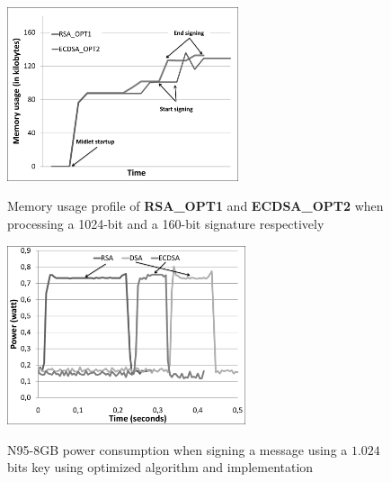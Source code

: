 \documentclass[authoryear]{elsarticle}
\begin{document}
\begin{figure}[h]
\begin{center}
  \includegraphics[width=6.8cm]{immagini/MemoryRSA1ECDSA2.pdf}\\
  \caption{Memory usage profile of \textbf{RSA\_OPT1} and \textbf{ECDSA\_OPT2} when processing a 1024-bit and a 160-bit signature respectively}
  \label{fig:MemoryRSA1ECDSA2}
\end{center}
\end{figure}

\newpage


\begin{figure}[t]
\begin{center}
  \includegraphics[width=7cm]{immagini/Power_OPT.pdf}\\
  \caption{N95-8GB power consumption when signing a message using a $1.024$ bits key using optimized algorithm and implementation}
  \label{fig:N95Power_OPT}
\end{center}
\end{figure}
\end{document}

